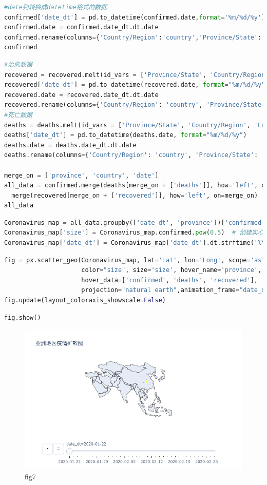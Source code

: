 \documentclass[UTF8,a4paper,12pt]{ctexart}  %
\begin{document}
\begin{lstlisting}[language=Python]
#date列转换成datetime格式的数据
confirmed['date_dt'] = pd.to_datetime(confirmed.date,format='%m/%d/%y')
confirmed.date = confirmed.date_dt.dt.date
confirmed.rename(columns={'Country/Region':'country','Province/State':'province'},inplace=True)
confirmed
\end{lstlisting}

\begin{lstlisting}[language=Python]
#治愈数据
recovered = recovered.melt(id_vars = ['Province/State', 'Country/Region', 'Lat', 'Long'], var_name='date',value_name = 'recovered')
recovered['date_dt'] = pd.to_datetime(recovered.date, format="%m/%d/%y")
recovered.date = recovered.date_dt.dt.date
recovered.rename(columns={'Country/Region': 'country', 'Province/State': 'province'}, inplace=True)
#死亡数据
deaths = deaths.melt(id_vars = ['Province/State', 'Country/Region', 'Lat', 'Long'], var_name='date', value_name = 'deaths')
deaths['date_dt'] = pd.to_datetime(deaths.date, format="%m/%d/%y")
deaths.date = deaths.date_dt.dt.date
deaths.rename(columns={'Country/Region': 'country', 'Province/State': 'province'}, inplace=True)

merge_on = ['province', 'country', 'date']
all_data = confirmed.merge(deaths[merge_on + ['deaths']], how='left', on=merge_on).\
  merge(recovered[merge_on + ['recovered']], how='left', on=merge_on)
all_data
\end{lstlisting}

\begin{lstlisting}[language=Python]
Coronavirus_map = all_data.groupby(['date_dt', 'province'])['confirmed', 'deaths','recovered', 'Lat', 'Long'].max().reset_index()
Coronavirus_map['size'] = Coronavirus_map.confirmed.pow(0.5)  # 创建实心圆大小
Coronavirus_map['date_dt'] = Coronavirus_map['date_dt'].dt.strftime('%Y-%m-%d')
\end{lstlisting}

\begin{lstlisting}[language=Python]
fig = px.scatter_geo(Coronavirus_map, lat='Lat', lon='Long', scope='asia',
                     color="size", size='size', hover_name='province',
                     hover_data=['confirmed', 'deaths', 'recovered'],
                     projection="natural earth",animation_frame="date_dt",title='亚洲地区疫情扩散图')
fig.update(layout_coloraxis_showscale=False)
\end{lstlisting}

\begin{lstlisting}[language=Python]
fig.show()
\end{lstlisting}

\begin{figure}
\centering
\includegraphics{./fig7.png}
\caption{fig7}
\end{figure}
\end{document}
